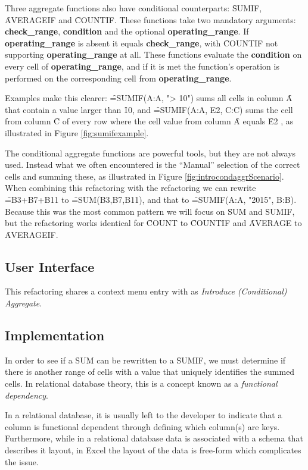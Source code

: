 Three aggregate functions also have conditional counterparts: \f{SUMIF}, \f{AVERAGEIF} and \f{COUNTIF}.
These functions take two mandatory arguments: \textbf{check_range}, \textbf{condition} and the optional \textbf{operating_range}.
If \textbf{operating_range} is absent it equals \textbf{check_range}, with \f{COUNTIF} not supporting \textbf{operating_range} at all.
These functions evaluate the \textbf{condition} on every cell of \textbf{operating_range}, and if it is met the function's operation is performed on the corresponding cell from \textbf{operating_range}.

Examples make this clearer: \f{=SUMIF(A:A, "> 10")} sums all cells in column \f{A} that contain a value larger than \f{10}, and \f{=SUMIF(A:A, E2, C:C)} sums the cell from column \f{C} of every row where the cell value from column \f{A} equals \f{E2} , as illustrated in Figure \ref{fig:sumifexample}.

The conditional aggregate functions are powerful tools, but they are not always used. 
Instead what we often encountered is the ``Manual'' selection of the correct cells and summing these, as illustrated in Figure \ref{fig:introcondaggrScenario}.
When combining this refactoring with the  refactoring we can rewrite \f{=B3+B7+B11} to \f{=SUM(B3,B7,B11)}, and that to \f{=SUMIF(A:A, "2015", B:B)}.
Because this was the most common pattern we will focus on \f{SUM} and \f{SUMIF}, but the refactoring works identical for \f{COUNT} to \f{COUNTIF} and \f{AVERAGE} to \f{AVERAGEIF}.

\subsection{User Interface}

This refactoring shares a context menu entry with  as \emph{Introduce (Conditional) Aggregate}.

\subsection{Implementation}

In order to see if a \f{SUM} can be rewritten to a \f{SUMIF}, we must determine if there is another range of cells with a value that uniquely identifies the summed cells.
In relational database theory, this is a concept known as a \emph{functional dependency}.

In a relational database, it is usually left to the developer to indicate that a column is functional dependent through defining which column(s) are keys.
Furthermore, while in a relational database data is associated with a schema that describes it layout, in Excel the layout of the data is free-form which complicates the issue.

